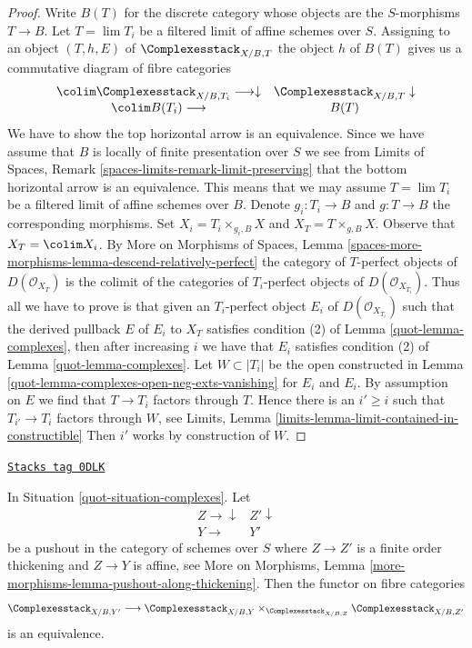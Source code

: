 \begin{proof}

Write $B(T)$ for the discrete category whose
objects are the $S$-morphisms $T \to B$. Let $T = \lim T_i$ be a filtered
limit of affine schemes over $S$. Assigning to an object
$(T, h, E)$ of $\Complexesstack_{X/B, T}$ the object $h$
of $B(T)$ gives us a commutative diagram of fibre categories
$$
\begin{array}{cc}\colim \Complexesstack_{X/B, T_i} \longrightarrow\downarrow & \Complexesstack_{X/B, T} \downarrow \\ \colim B(T_i) \longrightarrow & B(T)\end{array}
$$
We have to show the top horizontal arrow is an equivalence. Since
we have assume that $B$ is locally of finite presentation over $S$
we see from
Limits of Spaces, Remark \ref{spaces-limits-remark-limit-preserving}
that the bottom horizontal arrow is an equivalence. This means that
we may assume $T = \lim T_i$ be a filtered limit of affine schemes over
$B$. Denote $g_i : T_i \to B$ and $g : T \to B$ the corresponding
morphisms. Set $X_i = T_i \times_{g_i, B} X$ and $X_T = T \times_{g, B} X$.
Observe that $X_T = \colim X_i$.
By More on Morphisms of Spaces, Lemma
\ref{spaces-more-morphisms-lemma-descend-relatively-perfect}
the category of $T$-perfect objects of $D(\mathcal{O}_{X_T})$
is the colimit of the categories of $T_i$-perfect objects
of $D(\mathcal{O}_{X_{T_i}})$.
Thus all we have to prove is that given an $T_i$-perfect object
$E_i$ of $D(\mathcal{O}_{X_{T_i}})$ such that
the derived pullback $E$ of $E_i$ to $X_T$ satisfies
condition (2) of Lemma \ref{quot-lemma-complexes},
then after increasing $i$ we have that
$E_i$ satisfies
condition (2) of Lemma \ref{quot-lemma-complexes}.
Let $W \subset |T_i|$ be the open constructed
in Lemma \ref{quot-lemma-complexes-open-neg-exts-vanishing}
for $E_i$ and $E_i$. By assumption on $E$ we find
that $T \to T_i$ factors through $T$.
Hence there is an $i' \geq i$
such that $T_{i'} \to T_i$ factors through $W$, see
Limits, Lemma \ref{limits-lemma-limit-contained-in-constructible}
Then $i'$ works by construction of $W$.
\end{proof}

\begin{lemma}
\label{quot-lemma-complexes-RS-star}
\href{https://stacks.math.columbia.edu/tag/0DLK}{\texttt{Stacks tag 0DLK}}

In Situation \ref{quot-situation-complexes}. Let
$$
\begin{array}{cc}Z \longrightarrow\downarrow & Z' \downarrow \\ Y \longrightarrow & Y'\end{array}
$$
be a pushout in the category of schemes over $S$ where
$Z \to Z'$ is a finite order thickening and $Z \to Y$ is affine, see
More on Morphisms, Lemma \ref{more-morphisms-lemma-pushout-along-thickening}.
Then the functor on fibre categories
$$
\Complexesstack_{X/B, Y'}
\longrightarrow
\Complexesstack_{X/B, Y}
\times_{\Complexesstack_{X/B, Z}}
\Complexesstack_{X/B, Z'}
$$
is an equivalence.
\end{lemma}

